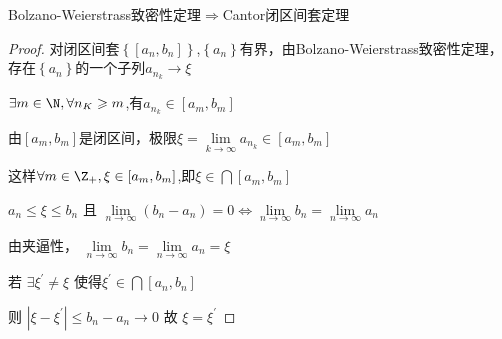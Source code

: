 \begin{proposition}
	Bolzano-Weierstrass致密性定理$\Rightarrow$Cantor闭区间套定理 
\end{proposition}
\begin{proof}
	对闭区间套$\left\{\left[a_n,b_n\right]\right\}$,$\left\{a_n\right\}$有界，由Bolzano-Weierstrass致密性定理，存在$\left\{a_n\right\}$的一个子列$a_{n_k}\rightarrow\xi$
	
	$\exists m\in \N,\forall n_K\geqslant m$,有$a_{n_k}\in\left[a_m,b_m\right]$
	
	由$\left[a_m,b_m\right]$是闭区间，极限$\xi=\lim\limits_{k\rightarrow\infty}a_{n_k}\in\left[a_m,b_m\right]$
	
	这样$\forall m\in\Z_+,\xi\in\left[a_m,b_m\right]$,即$\xi\in\bigcap\left[a_m,b_m\right]$
	
	$
	a_n \leqslant \xi \leqslant b_n $ 且 $ \lim\limits _{n \rightarrow \infty}\left(b_n-a_n\right)=0 \Leftrightarrow \lim\limits _{n \rightarrow \infty} b_n=\lim\limits _{n \rightarrow \infty} a_n
	$
	
	由夹逼性， $\lim\limits _{n \rightarrow \infty} b_n=\lim\limits _{n \rightarrow \infty} a_n=\xi$
	
	
	若 $\exists \xi^{\prime} \neq \xi$ 使得$\xi^{\prime} \in \bigcap\left[a_n, b_n\right]$
	
	则 $\left|\xi-\xi^{\prime}\right| \leqslant b_n-a_n \rightarrow 0$ 故 $\xi=\xi^{\prime}$
\end{proof}
